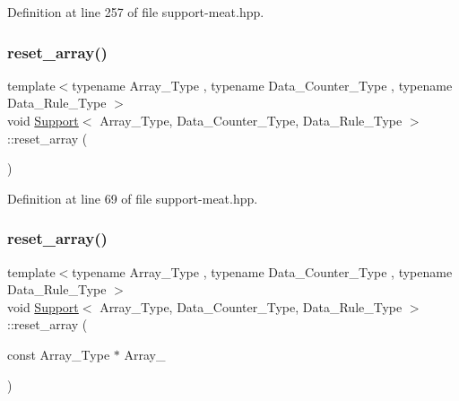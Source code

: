 Definition at line 257 of file support-\/meat.\+hpp.

\mbox{\label{class_support_a4f2860fd2e8e30703b91633a92ed7a58}} 
\subsubsection{\texorpdfstring{reset\+\_\+array()}{reset\_array()}\hspace{0.1cm}{\footnotesize\ttfamily [1/2]}}
{\footnotesize\ttfamily template$<$typename Array\+\_\+\+Type , typename Data\+\_\+\+Counter\+\_\+\+Type , typename Data\+\_\+\+Rule\+\_\+\+Type $>$ \\
void \hyperlink{class_support}{Support}$<$ Array\+\_\+\+Type, Data\+\_\+\+Counter\+\_\+\+Type, Data\+\_\+\+Rule\+\_\+\+Type $>$\+::reset\+\_\+array (\begin{DoxyParamCaption}{ }\end{DoxyParamCaption})\hspace{0.3cm}{\ttfamily [inline]}}



Definition at line 69 of file support-\/meat.\+hpp.

\mbox{\label{class_support_a6e39b22dfd1e0a0ceebf596c974f5326}} 
\subsubsection{\texorpdfstring{reset\+\_\+array()}{reset\_array()}\hspace{0.1cm}{\footnotesize\ttfamily [2/2]}}
{\footnotesize\ttfamily template$<$typename Array\+\_\+\+Type , typename Data\+\_\+\+Counter\+\_\+\+Type , typename Data\+\_\+\+Rule\+\_\+\+Type $>$ \\
void \hyperlink{class_support}{Support}$<$ Array\+\_\+\+Type, Data\+\_\+\+Counter\+\_\+\+Type, Data\+\_\+\+Rule\+\_\+\+Type $>$\+::reset\+\_\+array (\begin{DoxyParamCaption}\item[{const Array\+\_\+\+Type $\ast$}]{Array\+\_\+ }\end{DoxyParamCaption})\hspace{0.3cm}{\ttfamily [inline]}}



